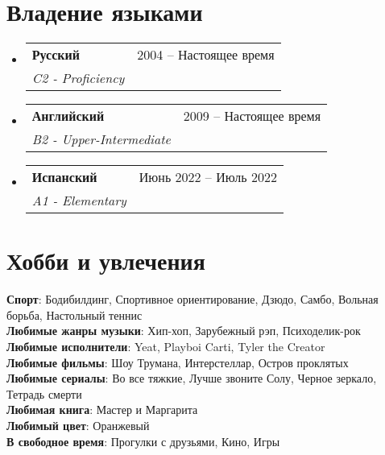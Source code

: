 \documentclass[letterpaper,11pt]{article}
\makeatletter
\newcommand{\resumeSubheading}[4]{
  \vspace{-2pt}\item
    \begin{tabular*}{0.97\textwidth}[t]{l@{\extracolsep{\fill}}r}
      \textbf{#1} & #2 \\
      \textit{\small#3} & \textit{\small #4} \\
    \end{tabular*}\vspace{-7pt}
}
\newcommand{\resumeSubHeadingListStart}{\begin{itemize}[leftmargin=0.15in, label={}]}
\newcommand{\resumeSubHeadingListEnd}{\end{itemize}}
\makeatother
\begin{document}
\section{Владение языками}
  \resumeSubHeadingListStart

    \resumeSubheading
      {Русский}{2004 – Настоящее время}
      {C2 - Proficiency}{}
    \resumeSubheading
      {Английский}{2009 – Настоящее время}
      {B2 - Upper-Intermediate}{}
    \resumeSubheading
      {Испанский}{Июнь 2022 – Июль 2022}
      {A1 - Elementary}{}
    \resumeSubHeadingListEnd

\section{Хобби и увлечения}
 \begin{itemize}[leftmargin=0.15in, label={}]
    \small{\item{
     \textbf{Спорт}{: Бодибилдинг, Спортивное ориентирование, Дзюдо, Самбо, Вольная борьба, Настольный теннис} \\
     \textbf{Любимые жанры музыки}{: Хип-хоп, Зарубежный рэп, Психоделик-рок} \\
     \textbf{Любимые исполнители}{: Yeat, Playboi Carti, Tyler the Creator} \\
     \textbf{Любимые фильмы}{: Шоу Трумана, Интерстеллар, Остров проклятых} \\
     \textbf{Любимые сериалы}{: Во все тяжкие, Лучше звоните Солу, Черное зеркало, Тетрадь смерти} \\
     \textbf{Любимая книга}{: Мастер и Маргарита} \\
     \textbf{Любимый цвет}{: Оранжевый} \\
     \textbf{В свободное время}{: Прогулки с друзьями, Кино, Игры}
    }}
 \end{itemize}
\end{document}
